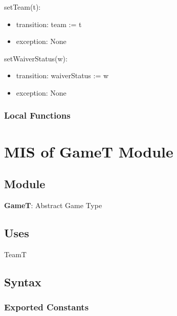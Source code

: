 \documentclass[12pt, titlepage]{article}
\begin{document}
\noindent setTeam(t):
\begin{itemize}
  \item transition: team := t
  \item exception: None
\end{itemize}

\noindent setWaiverStatus(w):
\begin{itemize}
  \item transition: waiverStatus := w
  \item exception: None
\end{itemize}


\subsubsection{Local Functions}

\newpage

\section{MIS of GameT Module} \label{GameTModule}

\subsection{Module}
\textbf{GameT}: Abstract Game Type

\subsection{Uses}
TeamT

\subsection{Syntax}

\subsubsection{Exported Constants}
\end{document}
